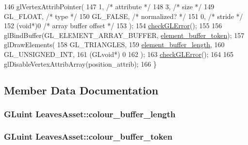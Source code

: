 \begin{DoxyCode}
146   glVertexAttribPointer(
147     1,        \textcolor{comment}{/* attribute */}
148     3,        \textcolor{comment}{/* size */}
149     GL\_FLOAT,   \textcolor{comment}{/* type */}
150     GL\_FALSE,   \textcolor{comment}{/* normalized? */}
151     0,        \textcolor{comment}{/* stride */}
152     (\textcolor{keywordtype}{void}*)0    \textcolor{comment}{/* array buffer offset */}
153   );
154   \hyperlink{LeavesAsset_8cc_a75f201b0e53e68726854997957322b8d}{checkGLError}();
155 
156   glBindBuffer(GL\_ELEMENT\_ARRAY\_BUFFER, \hyperlink{classLeavesAsset_a2a47b7b2ad8a35f4499a12db80073efb}{element\_buffer\_token});
157   glDrawElements(
158     GL\_TRIANGLES,
159     \hyperlink{classLeavesAsset_a6a09aacce21f8ce5a6b80da9f40bc9d5}{element\_buffer\_length},
160     GL\_UNSIGNED\_INT,
161     (GLvoid*) 0
162   );
163   \hyperlink{LeavesAsset_8cc_a75f201b0e53e68726854997957322b8d}{checkGLError}();
164 
165   glDisableVertexAttribArray(position\_attrib);
166 \}
\end{DoxyCode}


\subsection{Member Data Documentation}
\hypertarget{classLeavesAsset_aa98b368598e1181d85d9797e07506ecb}{}
\subsubsection[{colour\+\_\+buffer\+\_\+length}]{\setlength{\rightskip}{0pt plus 5cm}G\+Luint Leaves\+Asset\+::colour\+\_\+buffer\+\_\+length\hspace{0.3cm}{\ttfamily [private]}}\label{classLeavesAsset_aa98b368598e1181d85d9797e07506ecb}
\hypertarget{classLeavesAsset_a7e586bea0f5a80b9a262f11e31a5faac}{}
\subsubsection[{colour\+\_\+buffer\+\_\+token}]{\setlength{\rightskip}{0pt plus 5cm}G\+Luint Leaves\+Asset\+::colour\+\_\+buffer\+\_\+token\hspace{0.3cm}{\ttfamily [private]}}\label{classLeavesAsset_a7e586bea0f5a80b9a262f11e31a5faac}
\hypertarget{classLeavesAsset_a6a09aacce21f8ce5a6b80da9f40bc9d5}{}
